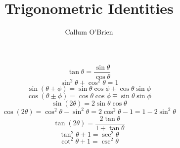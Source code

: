 \documentclass{article}
\begin{document}
\title{Trigonometric Identities}
\author{Callum O'Brien}
\date{}
\maketitle

\[\tan\theta = \frac{\sin\theta}{\cos\theta}\]
\[\sin^2\theta + \cos^2\theta = 1\]
\[\sin\left(\theta \pm \phi\right) = \sin\theta\cos\phi \pm \cos\theta\sin\phi\]
\[\cos\left(\theta \pm \phi\right) = \cos\theta\cos\phi \mp \sin\theta\sin\phi\]
\[\sin\left(2\theta\right) = 2\sin\theta\cos\theta\]
\[\cos\left(2\theta\right) = \cos^2\theta - \sin^2\theta = 2\cos^2\theta - 1 = 1 - 2\sin^2 \theta\]
\[\tan\left(2\theta\right) = \frac{2\tan\theta}{1+\tan\theta}\]
\[\tan^2\theta + 1 = \sec^2 \theta\]
\[\cot^2\theta + 1 = \csc^2 \theta\]
\end{document}
